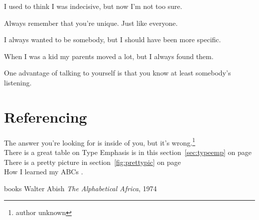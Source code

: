 \documentclass[a4paper,12pt]{book}
\begin{document}
\quad\parbox{2cm}{I used to think I was indecisive, but now I'm not too sure.}
\quad\parbox{2cm}{Always re\-mem\-ber that you're unique. Just like everyone.}
 
 
\quad\parbox{2cm}{\raggedright I always wanted to be somebody, but I should have been more specific.}
 
\quad\parbox{2cm}{\raggedleft When I was a kid my parents moved a lot, but I always found them. }
 
 
\begin{minipage}{5cm}
 
One advantage of talking to yourself is that you know at least somebody's listening.
 
\end{minipage}
 
 
\section{Referencing}
 
The answer you're looking for is inside of you, but it's wrong.\footnote[2]{author unknown} \\[2pt]
 
 
There is a great table on Type Emphasis is in this section~\ref{sec:typeemp} on page~\pageref{sec:typeemp}\\[2pt]
There is a pretty picture in section~\ref{fig:prettypic} on page~\pageref{fig:prettypic}\\[2pt]
 
 
How I learned my ABCs \cite{ABCAFR}. 
 
\begin{thebibliography} {books}
 Walter Abish \emph{The Alphabetical Africa}, 1974
\end{thebibliography}
 
\end{document}
